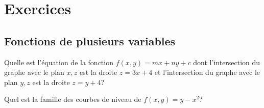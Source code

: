 \section{Exercices}

\subsection{Fonctions de plusieurs variables}

\begin{question}
Quelle est l'équation de la fonction $f(x,y) = mx + ny +c$ dont
l'intersection du graphe avec le plan $x,z$ est la droite $z=3x+4$ et
l'intersection du graphe avec le plan $y,z$ est la droite $z=y+4$?
\label{14Q1}
\end{question}

\begin{question}
Quel est la famille des courbes de niveau de $f(x,y) = y - x^2$?
\label{14Q2}
\end{question}

